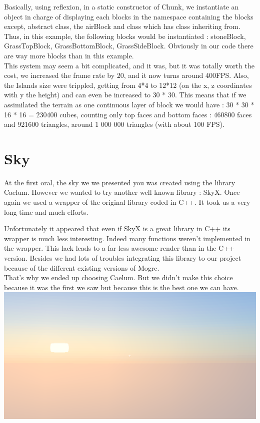 \documentclass[article]{report}             %
\begin{document}
Basically, using reflexion, in a static constructor of Chunk, we instantiate an object in charge of displaying each blocks in the namespace containing the blocks except, abstract class, the airBlock and class which has class inheriting from.\\
Thus, in this example, the following blocks would be instantiated : stoneBlock, GrassTopBlock, GrassBottomBlock, GrassSideBlock. Obviously in our code there are way more blocks 
than in this example.\\


This system may seem a bit complicated, and it was, but it was totally worth the cost, we increased the frame rate by 20, and it now turns around 400FPS. Also, the Islands size were trippled, getting from 4*4 to 12*12 (on the x, z coordinates with y the height) and can even be increased to 30 * 30. This means that if we assimilated the terrain as one continuous layer of block we would have : 	30 * 30 * 16 * 16 = 230400 cubes, counting only top faces and bottom faces : 460800 faces and 921600 triangles, around 1 000 000 triangles (with about 100 FPS).
			
			\section{Sky}
				At the first oral, the sky we we presented you was created using the library Caelum. However we wanted to try another well-known library : SkyX. Once again we used a wrapper of the original library coded in C++. It took us a very long time and much efforts.
				
Unfortunately it appeared that even if SkyX is a great library in C++ its wrapper is much less interesting. Indeed many functions weren't implemented in the wrapper. This lack leads to a far less awesome render than in the C++ version. Besides we had lots of troubles integrating this library to our project because of the different existing versions of Mogre.\\

That's why we ended up choosing Caelum. But we didn't make this choice because it was the first we saw but because this is the best one we can have. \\

				\includegraphics[width = 16cm]{images/Graphics/sky.png}
\end{document}
